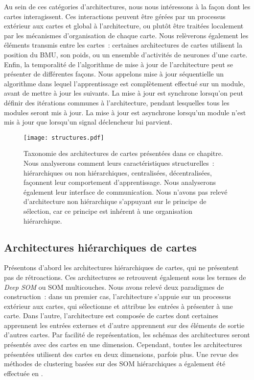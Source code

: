 \documentclass[../main]{subfiles}
\begin{document}
Au sein de ces catégories d'architectures, nous nous intéressons à la façon dont les cartes interagissent.
Ces interactions peuvent être gérées par un processus extérieur aux cartes et global à l'architecture, ou plutôt être traitées localement par les mécanismes d'organisation de chaque carte.
Nous relèverons également les éléments transmis entre les cartes~:
certaines architectures de cartes utilisent la position du BMU, son poids, ou un ensemble d'activités de neurones d'une carte.
Enfin, la temporalité de l'algorithme de mise à jour de l'architecture peut se présenter de différentes façons. Nous appelons mise à jour séquentielle un algorithme dans lequel l'apprentissage est complètement effectué sur un module, avant de mettre à jour les suivants. La mise à jour est synchrone lorsqu'on peut définir des itérations communes à l'architecture, pendant lesquelles tous les modules seront mis à jour. La mise à jour est asynchrone lorsqu'un module n'est mis à jour que lorsqu'un signal déclencheur lui parvient.

\begin{figure}
\centering\texttt{[image: structures.pdf]}
\caption{Taxonomie des architectures de cartes présentées dans ce chapitre. Nous analyserons comment leurs caractéristiques structurelles~: hiérarchiques ou non hiérarchiques, centralisées, décentralisées, façonnent leur comportement d'apprentissage. Nous analyserons également leur interface de communication. Nous n'avons pas relevé d'architecture non hiérarchique s'appuyant sur le principe de sélection, car ce principe est inhérent à une organisation hiérarchique. \label{fig:taxo}}
\end{figure}

\subsection{Architectures hiérarchiques de cartes}

Présentons d'abord les architectures hiérarchiques de cartes, qui ne présentent pas de rétroactions. Ces architectures se retrouvent également sous les termes de \emph{Deep SOM} ou SOM multicouches.
Nous avons relevé deux paradigmes de construction~: dans un premier cas, l'architecture s'appuie sur un processus extérieur aux cartes, qui sélectionne et attribue les entrées à présenter à une carte.
Dans l'autre, l'architecture est composée de cartes dont certaines apprennent les entrées externes et d'autre apprennent sur des éléments de sortie d'autres cartes.
Par facilité de représentation, les schémas des architectures seront présentés avec des cartes en une dimension. Cependant, toutes les architectures présentées utilisent des cartes en deux dimensions, parfois plus.
Une revue des méthodes de clustering basées sur des SOM hiérarchiques a également été effectuée en \cite{henriques_spatial_2012}.
\end{document}
